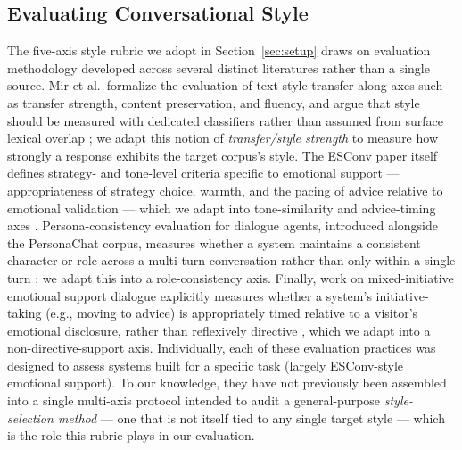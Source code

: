 \documentclass[manuscript,review,anonymous]{acmart}
\begin{document}
\subsection{Evaluating Conversational Style}
The five-axis style rubric we adopt in Section~\ref{sec:setup} draws on evaluation methodology developed across several distinct literatures rather than a single source. Mir et al.\ formalize the evaluation of text style transfer along axes such as transfer strength, content preservation, and fluency, and argue that style should be measured with dedicated classifiers rather than assumed from surface lexical overlap \cite{mir2019styletransfer}; we adapt this notion of \emph{transfer/style strength} to measure how strongly a response exhibits the target corpus's style. The ESConv paper itself defines strategy- and tone-level criteria specific to emotional support --- appropriateness of strategy choice, warmth, and the pacing of advice relative to emotional validation --- which we adapt into tone-similarity and advice-timing axes \cite{liu2021esconv}. Persona-consistency evaluation for dialogue agents, introduced alongside the PersonaChat corpus, measures whether a system maintains a consistent character or role across a multi-turn conversation rather than only within a single turn \cite{zhang2018persona}; we adapt this into a role-consistency axis. Finally, work on mixed-initiative emotional support dialogue explicitly measures whether a system's initiative-taking (e.g., moving to advice) is appropriately timed relative to a visitor's emotional disclosure, rather than reflexively directive \cite{deng2023mixedinitiative}, which we adapt into a non-directive-support axis. Individually, each of these evaluation practices was designed to assess systems built for a specific task (largely ESConv-style emotional support). To our knowledge, they have not previously been assembled into a single multi-axis protocol intended to audit a general-purpose \emph{style-selection method} --- one that is not itself tied to any single target style --- which is the role this rubric plays in our evaluation.
\end{document}
